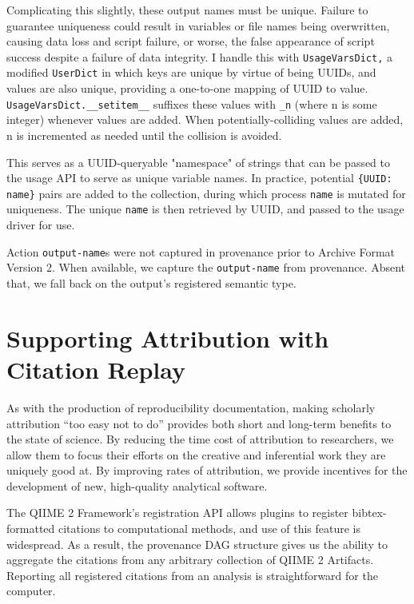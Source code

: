 Complicating this slightly, these output names must be unique. Failure to
guarantee uniqueness could result in variables or file names being overwritten,
causing data loss and script failure, or worse, the false appearance of script
success despite a failure of data integrity. I handle this with \texttt{UsageVarsDict,} a
modified \texttt{UserDict} in which keys are unique by virtue of being UUIDs, and values
are also unique, providing a one-to-one mapping of UUID to value.
\texttt{UsageVarsDict.\_\_setitem\_\_} suffixes these values with \texttt{\_n} (where n is some
integer) whenever values are added. When potentially-colliding values are added,
n is incremented as needed until the collision is avoided. 

This serves as a UUID-queryable "namespace" of strings that can be passed to the
usage API to serve as unique variable names. In practice, potential \texttt{\{UUID: name\}}
pairs are added to the collection, during which process \texttt{name} is mutated for
uniqueness. The unique \texttt{name} is then retrieved by UUID, and passed to the usage
driver for use.

Action \texttt{output-name}s were not captured in provenance prior to Archive Format
Version 2. When available, we capture the \texttt{output-name} from provenance. Absent
that, we fall back on the output’s registered semantic type.


\section{Supporting Attribution with Citation Replay}

As with the production of reproducibility documentation, making scholarly
attribution “too easy not to do” provides both short and long-term benefits to
the state of science. By reducing the time cost of attribution to researchers,
we allow them to focus their efforts on the creative and inferential work they
are uniquely good at. By improving rates of attribution, we provide incentives
for the development of new, high-quality analytical software. 

The QIIME 2 Framework’s registration API allows plugins to register
bibtex-formatted citations to computational methods, and use of this feature is
widespread. As a result, the provenance DAG structure gives us the ability to
aggregate the citations from any arbitrary collection of QIIME 2 Artifacts.
Reporting all registered citations from an analysis is straightforward for the
computer.

